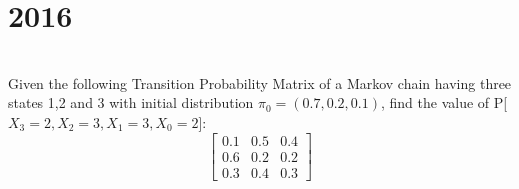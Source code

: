\section*{2016}
\vspace{-.5cm}
\hrulefill \smallskip\\
 Given the following Transition Probability Matrix of a Markov chain having three states 1,2 and 3 with initial distribution $\pi_0 = (0.7,0.2,0.1)$, find the value of P[$X_3=2,X_2=3,X_1=3,X_0=2$]:
\[ \begin{bmatrix} 0.1 & 0.5 & 0.4 \\
                   0.6 & 0.2 & 0.2 \\
                   0.3 & 0.4 & 0.3 \end{bmatrix} \]
                    